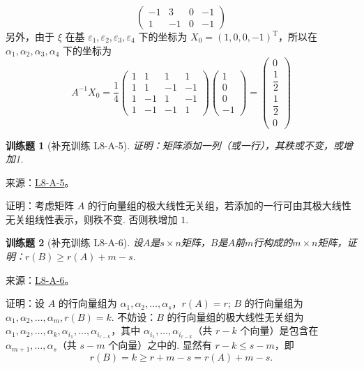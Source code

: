 \documentclass[12pt,fontset=fandol]{ctexart}
\newtheorem{exercise}{训练题}[section]
\begin{document}
\begin{solve}
\[\begin{pmatrix}
                    -1 & 3  & 0 & -1 \\
                    1  & -1 & 0 & -1
                \end{pmatrix} \]
            另外，由于 $ \xi $ 在基 $ \varepsilon_1, \varepsilon_2, \varepsilon_3, \varepsilon_4 $ 下的坐标为 $ X_0 = (1, 0, 0, -1)^{\mathrm{T}} $，所以在 $ \alpha_1, \alpha_2, \alpha_3, \alpha_4 $ 下的坐标为
            \[ A^{-1} X_0 = \dfrac{1}{4} \begin{pmatrix}
                    1 & 1  & 1  & 1  \\
                    1 & 1  & -1 & -1 \\
                    1 & -1 & 1  & -1 \\
                    1 & -1 & -1 & 1
                \end{pmatrix} \begin{pmatrix}
                    1 \\ 0 \\ 0 \\ -1
                \end{pmatrix} = \begin{pmatrix}
                    0 \\ \dfrac{1}{2} \\ \dfrac{1}{2} \\ 0
                \end{pmatrix} \]
\end{solve}

\begin{exercise}[补充训练 L8-A-5]\label{prob:L8-A-5}
证明：矩阵添加一列（或一行），其秩或不变，或增加1.
\end{exercise}
\noindent 来源：\href{https://github.com/yhwu-is/Linear-Algebra-Left-Undone/blob/new/%E8%AE%B2%E4%B9%89/%E4%B8%93%E9%A2%98/8%20%E7%9B%B8%E6%8A%B5%E6%A0%87%E5%87%86%E5%BD%A2.tex}{L8-A-5}。
\begin{solve}
证明：考虑矩阵 $A$ 的行向量组的极大线性无关组，若添加的一行可由其极大线性无关组线性表示，则秩不变. 否则秩增加 $1$.
\end{solve}

\begin{exercise}[补充训练 L8-A-6]\label{prob:L8-A-6}
设$A$是$s \times n$矩阵，$B$是$A$前$m$行构成的$m \times n$矩阵，证明：$r(B) \geqslant r(A) + m - s$.
\end{exercise}
\noindent 来源：\href{https://github.com/yhwu-is/Linear-Algebra-Left-Undone/blob/new/%E8%AE%B2%E4%B9%89/%E4%B8%93%E9%A2%98/8%20%E7%9B%B8%E6%8A%B5%E6%A0%87%E5%87%86%E5%BD%A2.tex}{L8-A-6}。
\begin{solve}
证明：设 $A$ 的行向量组为 $\alpha_1,\alpha_2,\ldots,\alpha_s$，$r(A)=r$; $B$ 的行向量组为 $\alpha_1,\alpha_2,\ldots,\alpha_m ,r(B)=k$.
            不妨设：$B$ 的行向量组的极大线性无关组为 $\alpha_1,\alpha_2,\ldots,\alpha_k,\alpha_{i_1},\ldots,\alpha_{i_{r-k}}$，其中 $\alpha_{i_1},\ldots,\alpha_{i_{r-k}}$（共 $r-k$ 个向量）是包含在 $\alpha_{m+1},\ldots,\alpha_s$（共 $s-m$ 个向量）之中的. 显然有 $r-k \leqslant s-m $，即
            \[r(B)=k\geqslant r+m-s=r(A)+m-s.\]
\end{solve}
\end{document}
